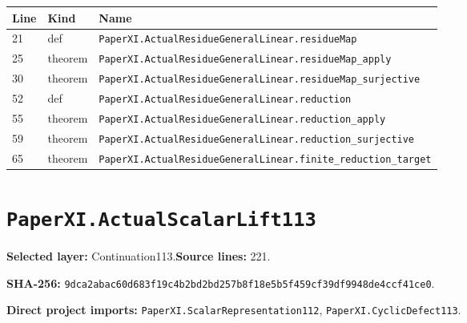 \documentclass[10pt,oneside]{book}
\begin{document}
\begin{longtable}{@{}p{}p{}p{}@{}}\toprule Line&Kind&Name\\\midrule\endhead

21&def&\nolinkurl{PaperXI.ActualResidueGeneralLinear.residueMap}\\

25&theorem&\nolinkurl{PaperXI.ActualResidueGeneralLinear.residueMap_apply}\\

30&theorem&\nolinkurl{PaperXI.ActualResidueGeneralLinear.residueMap_surjective}\\

52&def&\nolinkurl{PaperXI.ActualResidueGeneralLinear.reduction}\\

55&theorem&\nolinkurl{PaperXI.ActualResidueGeneralLinear.reduction_apply}\\

59&theorem&\nolinkurl{PaperXI.ActualResidueGeneralLinear.reduction_surjective}\\

65&theorem&\nolinkurl{PaperXI.ActualResidueGeneralLinear.finite_reduction_target}\\

\bottomrule\end{longtable}

\section{\texorpdfstring{\nolinkurl{PaperXI.ActualScalarLift113}}{PaperXI.ActualScalarLift113}}\label{module:PaperXI.ActualScalarLift113}

\textbf{Selected layer:} Continuation113.\quad\textbf{Source lines:} 221.\par\textbf{SHA-256:} {\scriptsize\nolinkurl{9dca2abac60d683f19c4b2bd2bd257b8f18e5b5f459cf39df9948de4ccf41ce0}}.


\textbf{Direct project imports:} \nolinkurl{PaperXI.ScalarRepresentation112}, \nolinkurl{PaperXI.CyclicDefect113}.
\end{document}
